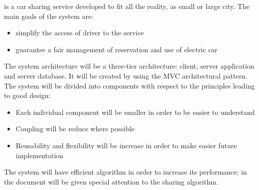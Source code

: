 \PowerEnJoy{} is a car sharing service developed to fit all the reality, as small or large city. 
The main goals of the system are: 
\begin{itemize} 
	\item simplify the access of driver to the service
	\item guarantee a fair management of reservation and use of electric car
\end{itemize}
The system architecture will be a three-tier architecture: client, server application and server database. It will be created by using the MVC architectural pattern.
The system will be divided into components with respect to the principles leading to good design:
\begin{itemize}
	\item Each individual component will be smaller in order to be easier to understand
	\item Coupling will be reduce where possible
	\item Reusability and flexibility will be increase in order to make easier future implementation
\end{itemize}
The system will have efficient algorithm in order to increase its performance; 
in the document will be given special attention to the sharing algorithm.
